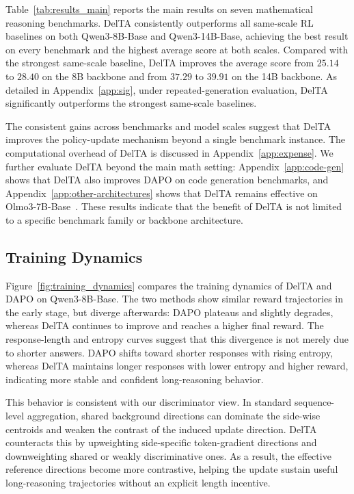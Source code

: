 \documentclass{llmxive}
\begin{document}
Table~\ref{tab:results_main} reports the main results on seven mathematical
reasoning benchmarks. DelTA consistently outperforms all same-scale RL baselines
on both Qwen3-8B-Base and Qwen3-14B-Base, achieving the best result on every
benchmark and the highest average score at both scales. Compared with the
strongest same-scale baseline, DelTA improves the average score from \(25.14\)
to \(28.40\) on the 8B backbone and from \(37.29\) to \(39.91\) on the 14B
backbone. As detailed in Appendix~\ref{app:sig}, under repeated-generation evaluation, DelTA significantly outperforms the strongest same-scale baselines.

The consistent gains across benchmarks and model scales suggest that DelTA improves the policy-update mechanism beyond a single benchmark instance. The computational overhead of DelTA is discussed in Appendix~\ref{app:expense}. We further evaluate DelTA beyond the main math setting: Appendix~\ref{app:code-gen} shows that DelTA also improves DAPO on code generation benchmarks, and Appendix~\ref{app:other-architectures} shows that DelTA remains effective on Olmo3-7B-Base~\citep{olmo2025olmo}.  These results indicate that the benefit of DelTA is not limited to a specific benchmark family or backbone architecture.

\subsection{Training Dynamics}
\label{sec:training-dynamics}
Figure~\ref{fig:training_dynamics} compares the training dynamics of DelTA and DAPO on Qwen3-8B-Base. 
The two methods show similar reward trajectories in the early stage, but diverge afterwards: DAPO plateaus and slightly degrades, whereas DelTA continues to improve and reaches a higher final reward. 
The response-length and entropy curves suggest that this divergence is not merely due to shorter answers. 
DAPO shifts toward shorter responses with rising entropy, whereas DelTA maintains longer responses with lower entropy and higher reward, indicating more stable and confident long-reasoning behavior.

This behavior is consistent with our discriminator view. 
In standard sequence-level aggregation, shared background directions can dominate the side-wise centroids and weaken the contrast of the induced update direction. 
DelTA counteracts this by upweighting side-specific token-gradient directions and downweighting shared or weakly discriminative ones. 
As a result, the effective reference directions become more contrastive, helping the update sustain useful long-reasoning trajectories without an explicit length incentive.
\end{document}
